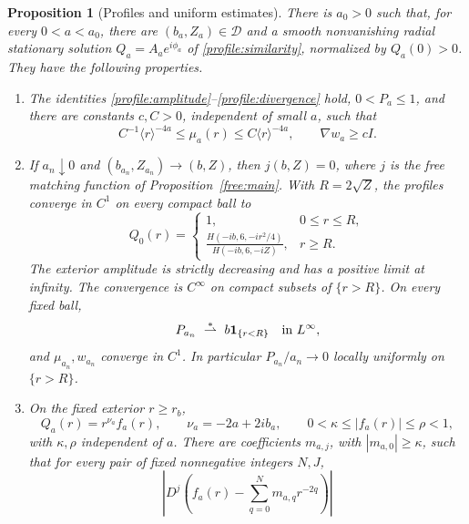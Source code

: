 \documentclass[11pt]{article}
\numberwithin{equation}{section}
\newtheorem{proposition}[theorem]{Proposition}
\theoremstyle{definition}
\theoremstyle{remark}
\begin{document}
\begin{proposition}[Profiles and uniform estimates]\label{profile:existence}
There is $a_0>0$ such that, for every $0<a<a_0$, there are
$(b_a,Z_a)\in\mathcal D$ and a smooth nonvanishing radial stationary
solution $Q_a=A_ae^{i\phi_a}$ of \eqref{profile:similarity}, normalized by
$Q_a(0)>0$.  They have the following properties.
\begin{enumerate}
\item The identities \eqref{profile:amplitude}--\eqref{profile:divergence}
hold, $0<P_a\le1$, and there are constants $c,C>0$, independent of small
$a$, such that
\begin{equation}\label{profile:coercive-bounds}
 C^{-1}\langle r\rangle^{-4a}\le\mu_a(r)
       \le C\langle r\rangle^{-4a},\qquad
 \nabla w_a\ge c I.
\end{equation}
\item If $a_n\downarrow0$ and $(b_{a_n},Z_{a_n})\to(b,Z)$, then
$j(b,Z)=0$, where $j$ is the free matching function of
Proposition~\ref{free:main}.  With $R=2\sqrt Z$, the profiles converge in
$C^1$ on every compact ball to
\begin{equation}\label{profile:limit}
 Q_0(r)=
 \begin{cases}
 1,&0\le r\le R,\\[2pt]
 \displaystyle\frac{H(-ib,6,-ir^2/4)}{H(-ib,6,-iZ)},&r\ge R.
 \end{cases}
\end{equation}
The exterior amplitude is strictly decreasing and has a positive limit
at infinity.  The convergence is $C^\infty$ on compact subsets of
$\{r>R\}$.  On every fixed ball,
\begin{equation}\label{profile:pressure-limit}
 P_{a_n}\ \stackrel{*}{\rightharpoonup}\ b\mathbf1_{\{r<R\}}
       \quad\hbox{in }L^\infty,
\end{equation}
and $\mu_{a_n},w_{a_n}$ converge in $C^1$.  In particular
$P_{a_n}/a_n\to0$ locally uniformly on $\{r>R\}$.
\item On the fixed exterior $r\ge r_b$,
\begin{equation}\label{profile:tail}
 Q_a(r)=r^{\nu_a}f_a(r),\qquad \nu_a=-2a+2ib_a,
 \qquad 0<\kappa\le|f_a(r)|\le\rho<1,
\end{equation}
with $\kappa,\rho$ independent of $a$.  There are coefficients
$m_{a,j}$, with $|m_{a,0}|\ge\kappa$, such that for every pair of fixed
nonnegative integers $N,J$,
\begin{equation}\label{profile:symbol-expansion}
 \left|D^j\left(f_a(r)-\sum_{q=0}^{N}m_{a,q}r^{-2q}\right)\right|

\end{equation}
\end{enumerate}
\end{proposition}
\end{document}
